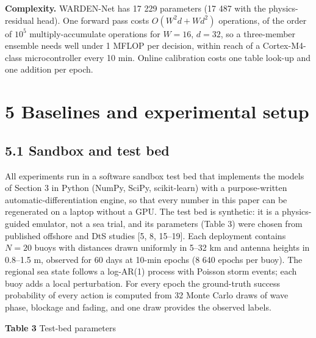 \documentclass[
  11pt,
]{article}
\begin{document}
\textbf{Complexity.} WARDEN-Net has 17 229 parameters (17 487 with the
physics-residual head). One forward pass costs \(O(W^2d+Wd^2)\)
operations, of the order of \(10^5\) multiply-accumulate operations for
\(W=16\), \(d=32\), so a three-member ensemble needs well under 1 MFLOP
per decision, within reach of a Cortex-M4-class microcontroller every 10
min. Online calibration costs one table look-up and one addition per
epoch.

\hypertarget{baselines-and-experimental-setup}{%
\section{5 Baselines and experimental
setup}\label{baselines-and-experimental-setup}}

\hypertarget{sandbox-and-test-bed}{%
\subsection{5.1 Sandbox and test bed}\label{sandbox-and-test-bed}}

All experiments run in a software sandbox test bed that implements the
models of Section 3 in Python (NumPy, SciPy, scikit-learn) with a
purpose-written automatic-differentiation engine, so that every number
in this paper can be regenerated on a laptop without a GPU. The test bed
is synthetic: it is a physics-guided emulator, not a sea trial, and its
parameters (Table 3) were chosen from published offshore and DtS studies
{[}5, 8, 15--19{]}. Each deployment contains \(N=20\) buoys with
distances drawn uniformly in 5--32 km and antenna heights in 0.8--1.5 m,
observed for 60 days at 10-min epochs (8 640 epochs per buoy). The
regional sea state follows a log-AR(1) process with Poisson storm
events; each buoy adds a local perturbation. For every epoch the
ground-truth success probability of every action is computed from 32
Monte Carlo draws of wave phase, blockage and fading, and one draw
provides the observed labels.


\textbf{Table 3} Test-bed parameters
\end{document}
